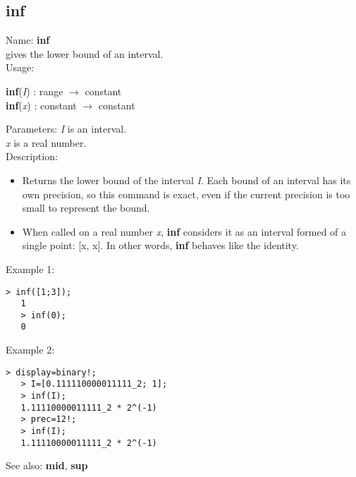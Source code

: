 \subsection{ inf }
\noindent Name: \textbf{inf}\\
gives the lower bound of an interval.\\

\noindent Usage: 
\begin{center}
\textbf{inf}(\emph{I}) : \textsf{range} $\rightarrow$ \textsf{constant}\\
\textbf{inf}(\emph{x}) : \textsf{constant} $\rightarrow$ \textsf{constant}\\
\end{center}
Parameters: 
\emph{I} is an interval.\\
\emph{x} is a real number.\\

\noindent Description: \begin{itemize}

\item Returns the lower bound of the interval \emph{I}. Each bound of an interval has its 
   own precision, so this command is exact, even if the current precision is too 
   small to represent the bound.

\item When called on a real number \emph{x}, \textbf{inf} considers it as an interval formed
   of a single point: [x, x]. In other words, \textbf{inf} behaves like the identity.
\end{itemize}
\noindent Example 1: 
\begin{center}\begin{minipage}{14.8cm}\begin{Verbatim}[frame=single]
   > inf([1;3]);
   1
   > inf(0);
   0
\end{Verbatim}
\end{minipage}\end{center}
\noindent Example 2: 
\begin{center}\begin{minipage}{14.8cm}\begin{Verbatim}[frame=single]
   > display=binary!;
   > I=[0.111110000011111_2; 1];
   > inf(I);
   1.11110000011111_2 * 2^(-1)
   > prec=12!;
   > inf(I);
   1.11110000011111_2 * 2^(-1)
\end{Verbatim}
\end{minipage}\end{center}
See also: \textbf{mid}, \textbf{sup}
